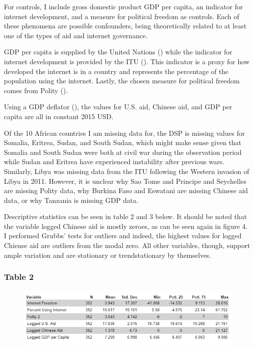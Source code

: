 \documentclass[12pt]{article}
\begin{document}
For controls, I include gross domestic product GDP per capita, an indicator for internet development, and a measure for political freedom as controls. Each of these phenomena are possible confounders, being theoretically related to at least one of the types of aid and internet governance. 

GDP per capita is supplied by the United Nations (\cite{unitednationsstatisticsdivision2019}) while the indicator for internet development is provided by the ITU (\cite{internationaltelecommunicationunion2022}). This indicator is a proxy for how developed the internet is in a country and represents the percentage of the population using the internet. Lastly, the chosen measure for political freedom comes from Polity (\cite{marshall2018}).

Using a GDP deflator (\cite{organizationforeconomicco-operationanddevelopment2022}), the values for U.S. aid, Chinese aid, and GDP per capita are all in constant 2015 USD.

Of the 10 African countries I am missing data for, the DSP is missing values for Somalia, Eritrea, Sudan, and South Sudan, which might make sense given that Somalia and South Sudan were both at civil war during the observation period while Sudan and Eritrea have experienced instability after previous wars. Similarly, Libya was missing data from the ITU following the Western invasion of Libya in 2011. However, it is unclear why Sao Tome and Principe and Seychelles are missing Polity data, why Burkina Faso and Eswatani are missing Chinese aid data, or why Tanzania is missing GDP data.

Descriptive statistics can be seen in table 2 and 3 below. It should be noted that the variable logged Chinese aid is mostly zeroes, as can be seen again in figure 4. I performed Grubbs' tests for outliers and indeed, the highest values for logged Chiense aid are outliers from the modal zero. All other variables, though, support ample variation and are stationary or trendstationary by themselves. 

\subsubsection*{Table 2}
\begin{figure}[htbp]
    \includegraphics[scale=0.8]{Figures/628table2.png}
\end{figure}
\pagebreak
\end{document}
